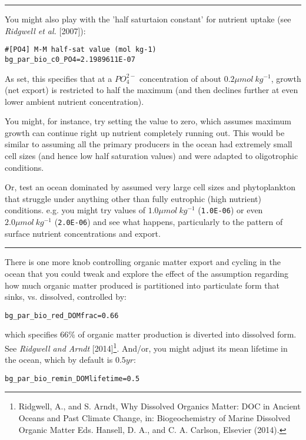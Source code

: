 \vspace{1mm} \noindent\rule{4cm}{0.5pt} \vspace{2mm}

\noindent You might also play with the 'half saturtaion constant' for nutrient uptake (see \textit{Ridgwell et al.} [2007]):
\vspace{-2mm}\small\begin{verbatim}
#[PO4] M-M half-sat value (mol kg-1)
bg_par_bio_c0_PO4=2.1989611E-07
\end{verbatim}\normalsize\vspace{-1mm}
As set, this specifies that at a \(PO^{2-}_{4}\) concentration of about \(0.2 \mu mol \:kg^{-1} \), growth (net export) is restricted to half the maximum (and then declines further at even lower ambient nutrient concentration).

\vspace{1mm}
You might, for instance, try setting the value to zero, which assumes maximum growth can continue right up nutrient completely running out. This would be similar to assuming all the primary producers in the ocean had extremely small cell sizes (and hence low half saturation values) and were adapted to oligotrophic conditions.

Or, test an ocean dominated by assumed very large cell sizes and phytoplankton that struggle under anything other than fully eutrophic (high nutrient) conditions. e.g. you might try values of \(1.0 \mu mol \:kg^{-1}\) (\texttt{1.0E-06}) or even \(2.0 \mu mol \:kg^{-1}\) (\texttt{2.0E-06}) and see what happens, particularly to the pattern of surface nutrient concentrations and export.

\vspace{1mm} \noindent\rule{4cm}{0.5pt} \vspace{2mm}

\noindent There is one more knob controlling organic matter export and cycling in the ocean that you could tweak and explore the effect of the assumption regarding how much organic matter produced is partitioned into particulate form that sinks, vs. dissolved, controlled by:
\vspace{-2mm}\small\begin{verbatim}
bg_par_bio_red_DOMfrac=0.66
\end{verbatim}\normalsize\vspace{-2mm}
which specifies 66\% of organic matter production is diverted into dissolved form. See \textit{Ridgwell and Arndt} [2014]\footnote{Ridgwell, A., and S. Arndt, Why Dissolved Organics Matter: DOC in Ancient Oceans and Past Climate Change, in: Biogeochemistry of Marine Dissolved Organic Matter Eds. Hansell, D. A., and C. A. Carlson, Elsevier (2014).}. And/or, you might adjust its mean lifetime in the ocean, which by default is  \(0.5 yr\):
\vspace{-2mm}\small\begin{verbatim}
bg_par_bio_remin_DOMlifetime=0.5
\end{verbatim}\normalsize\vspace{0mm}

